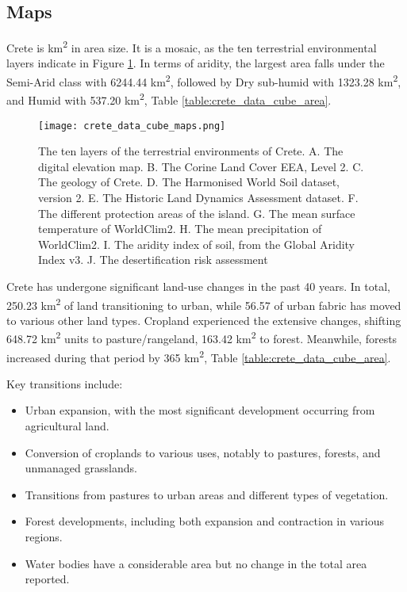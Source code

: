 \subsection{Maps}

Crete is km\textsuperscript{2} in area size. It is a mosaic, as the ten
terrestrial environmental layers indicate in Figure \ref{fig:crete_data_cube_map}.
In terms of aridity, the largest area falls under the Semi-Arid class with 6244.44 km\textsuperscript{2},
followed by Dry sub-humid with 1323.28 km\textsuperscript{2}, and Humid with 537.20 km\textsuperscript{2}, Table \ref{table:crete_data_cube_area}.

\begin{figure}[hbt!] 
    \centering\texttt{[image: crete\_data\_cube\_maps.png]}
    \caption[Crete data cube]{The ten layers of the terrestrial environments of Crete.
    A. The digital elevation map. B. The Corine Land Cover EEA, Level 2.
    C. The geology of Crete. D. The Harmonised World Soil dataset, version 2.
    E. The Historic Land Dynamics Assessment dataset. F. The different protection areas of the island.
    G. The mean surface temperature of WorldClim2. H. The mean precipitation of  WorldClim2.
    I. The aridity index of soil, from the Global Aridity Index v3. J. The desertification risk assessment}
    \label{fig:crete_data_cube_map}
\end{figure}

Crete has undergone significant land-use changes in the past 40 years. In total, 250.23 km\textsuperscript{2}
of land transitioning to urban, while 56.57 of urban fabric has moved to various other land types.
Cropland experienced the extensive changes, shifting 648.72 km\textsuperscript{2}
units to pasture/rangeland, 163.42 km\textsuperscript{2} to forest.
Meanwhile, forests increased during that period by 365 km\textsuperscript{2}, Table \ref{table:crete_data_cube_area}.

Key transitions include:
\begin{itemize}
    \item Urban expansion, with the most significant development occurring from agricultural land.
    \item Conversion of croplands to various uses, notably to pastures, forests, and unmanaged grasslands.
    \item Transitions from pastures to urban areas and different types of vegetation.
    \item Forest developments, including both expansion and contraction in various regions.
    \item Water bodies have a considerable area but no change in the total area reported.
\end{itemize}

